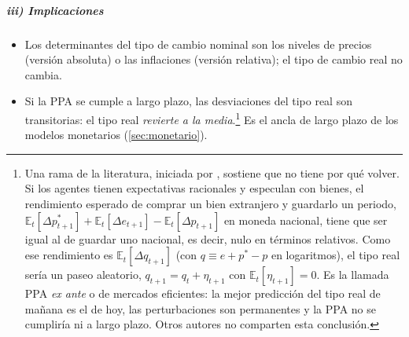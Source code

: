 \documentclass[11pt]{article}
\begin{document}
\subparagraph{iii) Implicaciones}
\begin{itemize}
\item Los determinantes del tipo de cambio nominal son los niveles de precios (versión absoluta) o las inflaciones (versión relativa); el tipo de cambio real no cambia.
\item Si la PPA se cumple a largo plazo, las desviaciones del tipo real son transitorias: el tipo real \emph{revierte a la media}.\footnote{Una rama de la literatura, iniciada por \textcite{Roll1979PPP}, sostiene que no tiene por qué volver. Si los agentes tienen expectativas racionales y especulan con bienes, el rendimiento esperado de comprar un bien extranjero y guardarlo un periodo, $\mathbb{E}_t[\Delta p^*_{t+1}]+\mathbb{E}_t[\Delta e_{t+1}]-\mathbb{E}_t[\Delta p_{t+1}]$ en moneda nacional, tiene que ser igual al de guardar uno nacional, es decir, nulo en términos relativos. Como ese rendimiento es $\mathbb{E}_t[\Delta q_{t+1}]$ (con $q\equiv e+p^*-p$ en logaritmos), el tipo real sería un paseo aleatorio, $q_{t+1}=q_t+\eta_{t+1}$ con $\mathbb{E}_t[\eta_{t+1}]=0$. Es la llamada PPA \emph{ex ante} o de mercados eficientes: la mejor predicción del tipo real de mañana es el de hoy, las perturbaciones son permanentes y la PPA no se cumpliría ni a largo plazo. Otros autores no comparten esta conclusión.} Es el ancla de largo plazo de los modelos monetarios (\ref{sec:monetario}).
\end{itemize}
\end{document}
